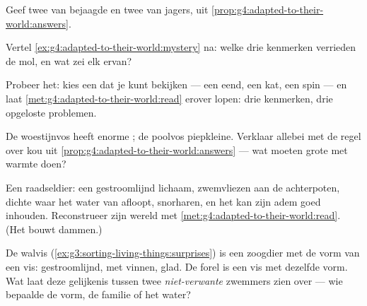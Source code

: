 \begin{exercise}[$\star$]\label{exo:g4:adapted-to-their-world:6}
Geef twee  van bejaagde  en twee van jagers, uit
\cref{prop:g4:adapted-to-their-world:answers}.
\end{exercise}

\begin{exercise}[$\star$]\label{exo:g4:adapted-to-their-world:7}
Vertel \cref{ex:g4:adapted-to-their-world:mystery} na: welke drie
kenmerken verrieden de mol, en wat zei elk ervan?
\end{exercise}

\begin{exercise}[$\star$]\label{exo:g4:adapted-to-their-world:8}
Probeer het: kies een  dat je kunt bekijken --- een eend, een kat,
een spin --- en laat \cref{met:g4:adapted-to-their-world:read} erover
lopen: drie kenmerken, drie opgeloste problemen.
\end{exercise}

\begin{exercise}[$\star\star$]\label{exo:g4:adapted-to-their-world:9}
De woestijnvos heeft enorme ; de poolvos piepkleine. Verklaar
allebei met de regel over kou uit
\cref{prop:g4:adapted-to-their-world:answers} --- wat moeten grote 
met warmte doen?
\end{exercise}

\begin{exercise}[$\star\star$]\label{exo:g4:adapted-to-their-world:10}
Een raadseldier: een gestroomlijnd lichaam, zwemvliezen aan de
achterpoten, dichte  waar het water van afloopt, snorharen, en het
kan zijn adem goed inhouden. Reconstrueer zijn wereld met
\cref{met:g4:adapted-to-their-world:read}. (Het bouwt dammen.)
\end{exercise}

\begin{exercise}[$\star\star\star$]\label{exo:g4:adapted-to-their-world:11}
De walvis (\cref{ex:g3:sorting-living-things:surprises}) is een zoogdier
met de vorm van een vis: gestroomlijnd, met vinnen, glad. De forel is
een vis met dezelfde vorm. Wat laat deze gelijkenis tussen twee
\emph{niet-verwante} zwemmers zien over  --- wie bepaalde de
vorm, de familie of het water?
\end{exercise}
